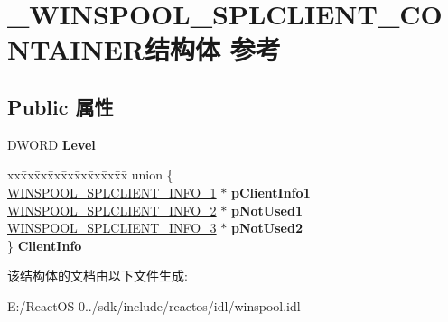 \hypertarget{struct___w_i_n_s_p_o_o_l___s_p_l_c_l_i_e_n_t___c_o_n_t_a_i_n_e_r}{}\section{\+\_\+\+W\+I\+N\+S\+P\+O\+O\+L\+\_\+\+S\+P\+L\+C\+L\+I\+E\+N\+T\+\_\+\+C\+O\+N\+T\+A\+I\+N\+E\+R结构体 参考}
\label{struct___w_i_n_s_p_o_o_l___s_p_l_c_l_i_e_n_t___c_o_n_t_a_i_n_e_r}
\subsection*{Public 属性}
\begin{DoxyCompactItemize}
\item 
\mbox{\label{struct___w_i_n_s_p_o_o_l___s_p_l_c_l_i_e_n_t___c_o_n_t_a_i_n_e_r_a74871ccb1f19e1ec6108e6f5eb4f70fc}} 
D\+W\+O\+RD {\bfseries Level}
\item 
\mbox{\label{struct___w_i_n_s_p_o_o_l___s_p_l_c_l_i_e_n_t___c_o_n_t_a_i_n_e_r_a1130d5769570faaeb8485985bb29afdc}} 
\begin{tabbing}
xx\=xx\=xx\=xx\=xx\=xx\=xx\=xx\=xx\=\kill
union \{\\
\>\hyperlink{struct___w_i_n_s_p_o_o_l___s_p_l_c_l_i_e_n_t___i_n_f_o__1}{WINSPOOL\_SPLCLIENT\_INFO\_1} $\ast$ {\bfseries pClientInfo1}\\
\>\hyperlink{struct___w_i_n_s_p_o_o_l___s_p_l_c_l_i_e_n_t___i_n_f_o__2}{WINSPOOL\_SPLCLIENT\_INFO\_2} $\ast$ {\bfseries pNotUsed1}\\
\>\hyperlink{struct___w_i_n_s_p_o_o_l___s_p_l_c_l_i_e_n_t___i_n_f_o__3}{WINSPOOL\_SPLCLIENT\_INFO\_3} $\ast$ {\bfseries pNotUsed2}\\
\} {\bfseries ClientInfo}\\

\end{tabbing}\end{DoxyCompactItemize}


该结构体的文档由以下文件生成\+:\begin{DoxyCompactItemize}
\item 
E\+:/\+React\+O\+S-\/0../sdk/include/reactos/idl/winspool.\+idl\end{DoxyCompactItemize}
